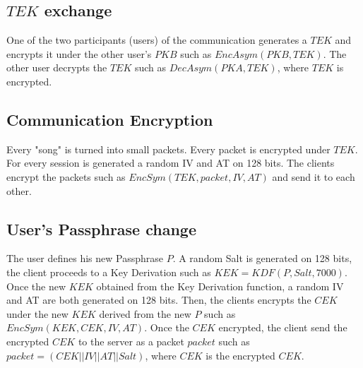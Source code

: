 \documentclass[a4paper,10pt]{article}
\begin{document}
\subsection{$TEK$ exchange}
One of the two participants (users) of the communication generates a $TEK$ and encrypts it under the other user's $PKB$ such as $EncAsym(PKB, TEK)$. The other user decrypts the $TEK$ such as $DecAsym(PKA, TEK)$, where $TEK$ is encrypted.

\subsection{Communication Encryption}
Every "song" is turned into small packets. Every packet is encrypted under $TEK$. For every session is generated a random IV and AT on 128 bits. The clients encrypt the packets such as $EncSym(TEK, packet,IV,AT)$ and send it to each other.

\subsection{User's Passphrase change}
The user defines his new Passphrase $P$. A random Salt is generated on 128 bits, the client proceeds to a Key Derivation such as $KEK=KDF(P, Salt, 7000)$. Once the new $KEK$ obtained from the Key Derivation function, a random IV and AT are both generated on 128 bits. Then, the clients encrypts the $CEK$ under the new $KEK$ derived from the new $P$ such as $EncSym(KEK,CEK,IV,AT)$. Once the $CEK$ encrypted, the client send the encrypted $CEK$ to the server as a packet $packet$ such as $packet=(CEK||IV||AT||Salt)$, where $CEK$ is the encrypted $CEK$.
 
\end{document}
